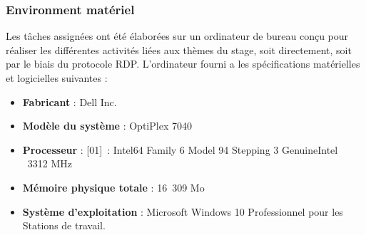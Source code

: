 \subsubsection{Environment matériel}
Les tâches assignées ont été élaborées sur un ordinateur de bureau conçu pour réaliser les différentes activités liées aux thèmes du stage, soit directement, soit par le biais du protocole RDP. L'ordinateur fourni a les spécifications matérielles et logicielles suivantes :
\begin{itemize}
    \item \textbf{Fabricant} : Dell Inc.
    \item \textbf{Modèle du système} : OptiPlex 7040
    \item \textbf{Processeur} : [01] : Intel64 Family 6 Model 94 Stepping 3 GenuineIntel ~3312 MHz
    \item \textbf{Mémoire physique totale} :  16 309 Mo
    \item \textbf{Système d’exploitation} : Microsoft Windows 10 Professionnel pour les Stations de travail.
\end{itemize}

